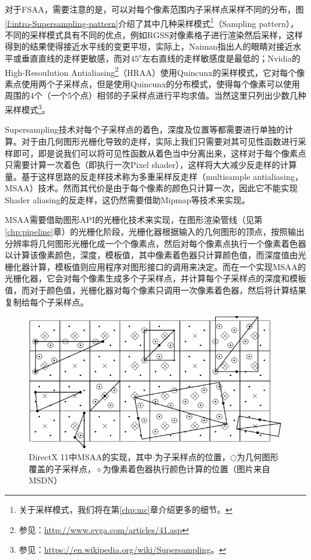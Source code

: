 对于FSAA，需要注意的是，可以对每个像素范围内子采样点采样不同的分布，图\ref{f:intro-Supersampling-pattern}介绍了其中几种采样模式\footnote{关于采样模式，我们将在第\ref{chp:mc}章介绍更多的细节。}（Sampling pattern），不同的采样模式具有不同的优点，例如RGSS对像素格子进行渲染然后采样，这样得到的结果使得接近水平线的变更平坦，实际上，Naiman指出\cite{a:Jaggededges:whenisfilteringneeded?}人的眼睛对接近水平或垂直直线的走样更敏感，而对$45^{o}$左右直线的走样敏感度是最低的；Nvidia的High-Resoulution Antialiasing\footnote{参见：\url{http://www.evga.com/articles/41.asp}}（HRAA）使用Quincunx的采样模式，它对每个像素点使用两个子采样点，但是使用Quincunx的分布模式，使得每个像素可以使用周围的4个（一个5个点）相邻的子采样点进行平均求值。当然这里只列出少数几种采样模式\footnote{参见：\url{https://en.wikipedia.org/wiki/Supersampling}。}。

Supersampling技术对每个子采样点的着色，深度及位置等都需要进行单独的计算。对于由几何图形光栅化导致的走样，实际上我们只需要对其可见性函数进行采样即可，即是说我们可以将可见性函数从着色当中分离出来，这样对于每个像素点只需要计算一次着色（即执行一次Pixel shader），这样将大大减少反走样的计算量。基于这样思路的反走样技术称为多重采样反走样（multisample antialiasing，MSAA）技术。然而其代价是由于每个像素的颜色只计算一次，因此它不能实现Shader aliasing的反走样，这仍然需要借助Mipmap等技术来实现。

MSAA需要借助图形API的光栅化技术来实现，在图形渲染管线（见第\ref{chp:pipeline}章）的光栅化阶段，光栅化器根据输入的几何图形的顶点，按照输出分辨率将几何图形光栅化成一个个像素点，然后对每个像素点执行一个像素着色器以计算该像素颜色，深度，模板值，其中像素着色器只计算颜色值，而深度值由光栅化器计算，模板值则应用程序对图形接口的调用来决定。而在一个实现MSAA的光栅化器，它会对每个像素生成多个子采样点，并计算每个子采样点的深度和模板值，而对于颜色值，光栅化器对每个像素只调用一次像素着色器，然后将计算结果复制给每个子采样点。

\begin{figure}
	\includegraphics[width=1.\textwidth]{figures/intro/msaa}
	\caption{DirectX 11中MSAA的实现，其中$\cdot$为子采样点的位置，$\bigcirc$为几何图形覆盖的子采样点，$\diamond$为像素着色器执行颜色计算的位置（图片来自MSDN）}
	\label{f:intro-msaa}
\end{figure}

